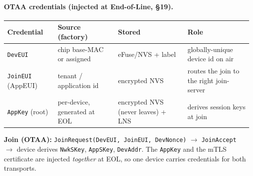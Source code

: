 \paragraph{OTAA credentials (injected at End-of-Line, \S19).}
\begin{center}
\renewcommand{\arraystretch}{1.22}\small
\begin{tabularx}{\textwidth}{@{}l l l X@{}}
\toprule
\textbf{Credential} & \textbf{Source (factory)} & \textbf{Stored} & \textbf{Role} \\
\midrule
\texttt{DevEUI} & chip base-MAC or assigned & eFuse/NVS + label & globally-unique device id on air \\
\texttt{JoinEUI} (AppEUI) & tenant / application id & encrypted NVS & routes the join to the right join-server \\
\texttt{AppKey} (root) & per-device, generated at EOL & encrypted NVS (never leaves) + LNS & derives session keys at join \\
\bottomrule
\end{tabularx}
\end{center}
\noindent\textbf{Join (OTAA):} \texttt{JoinRequest(DevEUI, JoinEUI, DevNonce)} $\to$
\texttt{JoinAccept} $\to$ device derives \texttt{NwkSKey}, \texttt{AppSKey}, \texttt{DevAddr}. The
\texttt{AppKey} and the mTLS certificate are injected \emph{together} at EOL, so one device carries
credentials for both transports.

